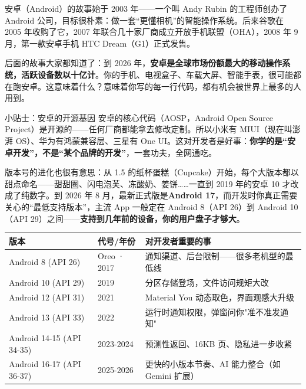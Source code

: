 


安卓（Android）的故事始于 2003 年——一个叫 Andy Rubin 的工程师创办了 Android 公司，目标很朴素：做一套“更懂相机”的智能操作系统。后来谷歌在 2005 年收购了它，2007 年联合几十家厂商成立开放手机联盟（OHA），2008 年 9 月，第一款安卓手机 HTC Dream（G1）正式发售。

后面的故事大家都知道了：到 2026 年，\textbf{安卓是全球市场份额最大的移动操作系统，活跃设备数以十亿计}。你的手机、电视盒子、车载大屏、智能手表，很可能都在跑安卓。这意味着什么？意味着你写的每一行代码，都有机会被世界上最多的人用到。

\begin{tcbinfo}{小贴士：安卓的开源基因}
安卓的核心代码（AOSP，Android Open Source Project）是开源的——任何厂商都能拿去修改定制。所以小米有 MIUI（现在叫澎湃 OS）、华为有鸿蒙兼容层、三星有 One UI。这对开发者是好事：\textbf{你学的是“安卓开发”，不是“某个品牌的开发”}，一套功夫，全网通吃。

\end{tcbinfo}

版本号的进化也很有意思：从 1.5 的纸杯蛋糕（Cupcake）开始，每个大版本都以甜点命名——甜甜圈、闪电泡芙、冻酸奶、姜饼……一直到 2019 年的安卓 10 才改成了纯数字。到 2026 年 8 月，最新正式版是\textbf{Android 17}，而开发时你真正需要关心的“最低支持版本”，主流 App 一般定在 Android 8（API 26）到 Android 10（API 29）之间——\textbf{支持到几年前的设备，你的用户盘子才够大}。

\begin{center}
\begin{tabularx}{\linewidth}{|X|X|X|}
\hline
\textbf{版本} & \textbf{代号/年份} & \textbf{对开发者重要的事} \tabularnewline
\hline
Android 8 (API 26) & Oreo · 2017 & 通知渠道、后台限制——很多老机型的最低线 \tabularnewline
Android 10 (API 29) & 2019 & 分区存储登场，文件访问规矩大改 \tabularnewline
Android 12 (API 31) & 2021 & Material You 动态取色，界面观感大升级 \tabularnewline
Android 13 (API 33) & 2022 & 运行时通知权限，弹窗问你"准不准发通知" \tabularnewline
Android 14-15 (API 34-35) & 2023-2024 & 预测性返回、16KB 页、隐私进一步收紧 \tabularnewline
Android 16-17 (API 36-37) & 2025-2026 & 更快的小版本节奏、AI 能力整合（如 Gemini 扩展） \tabularnewline
\hline
\end{tabularx}
\end{center}

